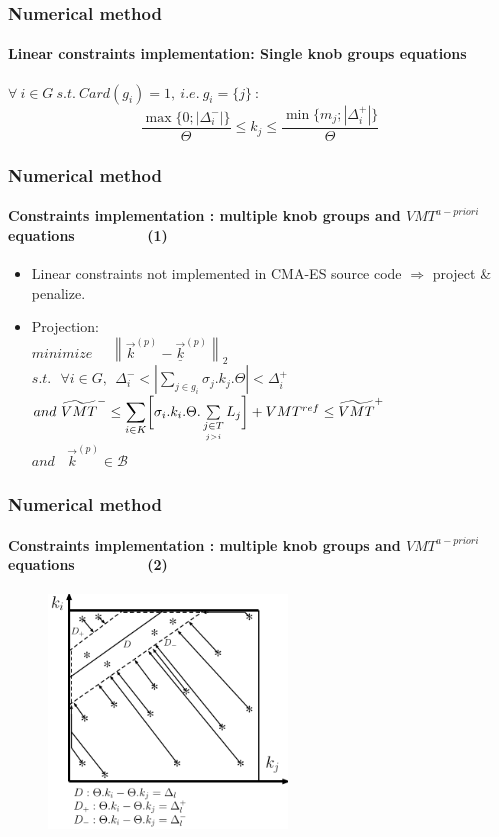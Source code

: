 \documentclass[fleqn]{beamer}
\newcommand\norm[1]{\left\lVert#1\right\rVert}
\begin{document}
\begin{frame}
	\frametitle{Numerical method}
	\framesubtitle{Linear constraints implementation: Single knob groups equations}
	$\forall\ i\in G\ s.t.\ Card(g_{i})=1,\ i.e.\ g_{i}=\{j\}\ :$
\begin{equation}
	\frac{\max{\big\{0;|\Delta_{i}^{-}|\big\}}}{\Theta}\leq k_{j} \leq \frac{\min{\big\{m_{j};|\Delta_{i}^{+}|\big\}}}{\Theta}
\end{equation}
\end{frame}


\begin{frame}
	\frametitle{Numerical method}
	\framesubtitle{Constraints implementation : multiple knob groups and $VMT^{a-priori}$ equations~~~~~~~~~(1)}
	\begin{itemize}
	 \item Linear constraints not implemented in CMA-ES source code $\Rightarrow$ project \& penalize.
	 \item Projection: \\ 
	 $minimize \ \ \ \ \ \ \norm{\vec{k}^{(p)}-\underline{\vec{k}}^{(p)}}_{2}$\\
$s.t.\ \ \ \forall i\in{G}, \ \ \Delta_{i}^{-}< |\sum_{j\in{g_{i}}} \sigma_{j}.k_{j}.\Theta|<\Delta_{i}^{+}$\\
$and\ \widetilde{VMT}^{-}\leq\mathlarger{\sum\limits_{i\in K}}\biggl[\sigma_{i}.k_{i}.\Theta.	\sum\limits_{\underset{j>i}{j\in T}}L_{j}\biggr]+VMT^{ref}\leq \widetilde{VMT}^{+}\nonumber $\\
$and\ \ \ \ \vec{k}^{(p)}\in \mathscr{B}$\\
	\end{itemize}\end{frame}


\begin{frame}
	\frametitle{Numerical method}
	\framesubtitle{Constraints implementation : multiple knob groups and $VMT^{a-priori}$ equations~~~~~~~~~(2)}
	\begin{figure}
		\centering
		\includegraphics[width=2.5in]{figures/proj.pdf}	
	\end{figure}
\end{frame}
\end{document}
